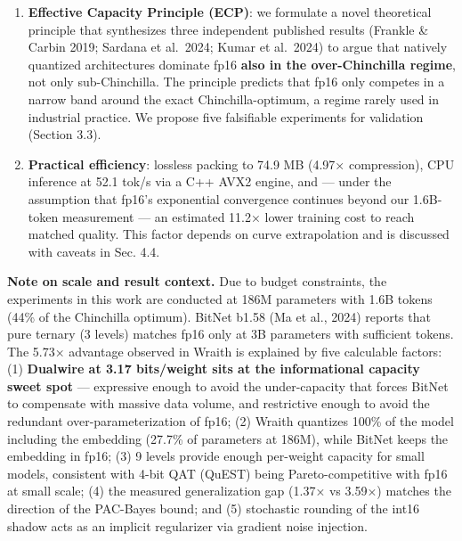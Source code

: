 \begin{enumerate}
  per-level fraction: 1.41\%), ruling out the hypothesis of degeneration
  toward BitNet during training. The derived scales \(sc\) and \(sf\)
  converge to comparable magnitudes (\(sf/sc \approx 0.95\)), indicating
  the model exploits both dimensions as complementary scales of similar
  weight.
\item
  \textbf{Effective Capacity Principle (ECP)}: we formulate a novel
  theoretical principle that synthesizes three independent published
  results (Frankle \& Carbin 2019; Sardana et al.~2024; Kumar et
  al.~2024) to argue that natively quantized architectures dominate fp16
  \textbf{also in the over-Chinchilla regime}, not only sub-Chinchilla.
  The principle predicts that fp16 only competes in a narrow band around
  the exact Chinchilla-optimum, a regime rarely used in industrial
  practice. We propose five falsifiable experiments for validation
  (Section 3.3).
\item
  \textbf{Practical efficiency}: lossless packing to 74.9 MB (4.97×
  compression), CPU inference at 52.1 tok/s via a C++ AVX2 engine, and
  --- under the assumption that fp16's exponential convergence continues
  beyond our 1.6B-token measurement --- an estimated 11.2× lower
  training cost to reach matched quality. This factor depends on curve
  extrapolation and is discussed with caveats in Sec. 4.4.
\end{enumerate}

\textbf{Note on scale and result context.} Due to budget constraints,
the experiments in this work are conducted at 186M parameters with 1.6B
tokens (44\% of the Chinchilla optimum). BitNet b1.58 (Ma et al., 2024)
reports that pure ternary (3 levels) matches fp16 only at 3B parameters
with sufficient tokens. The 5.73× advantage observed in Wraith is
explained by five calculable factors: (1) \textbf{Dualwire at 3.17
bits/weight sits at the informational capacity sweet spot} ---
expressive enough to avoid the under-capacity that forces BitNet to
compensate with massive data volume, and restrictive enough to avoid the
redundant over-parameterization of fp16; (2) Wraith quantizes 100\% of
the model including the embedding (27.7\% of parameters at 186M), while
BitNet keeps the embedding in fp16; (3) 9 levels provide enough
per-weight capacity for small models, consistent with 4-bit QAT (QuEST)
being Pareto-competitive with fp16 at small scale; (4) the measured
generalization gap (1.37× vs 3.59×) matches the direction of the
PAC-Bayes bound; and (5) stochastic rounding of the int16 shadow acts as
an implicit regularizer via gradient noise injection.

